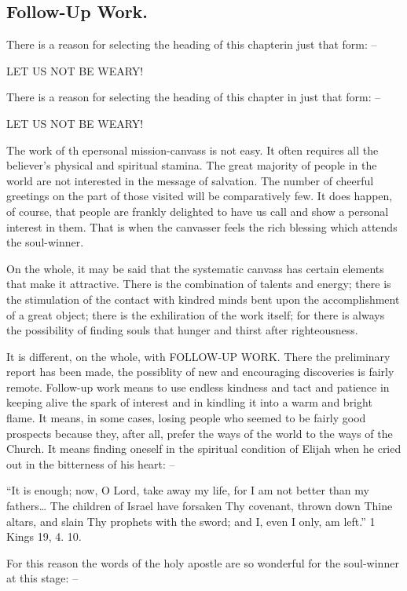\documentclass[
]{book}
\begin{document}
\hypertarget{follow-up-work.}{%
\subsection*{Follow-Up Work.}\label{follow-up-work.}}

There is a reason for selecting the heading of this chapterin just that form: --

LET US NOT BE WEARY!

There is a reason for selecting the heading of this chapter in just that form: --

LET US NOT BE WEARY!

The work of th epersonal mission-canvass is not easy. It often requires all the believer's physical and spiritual stamina. The great majority of people in the world are not interested in the message of salvation. The number of cheerful greetings on the part of those visited will be comparatively few. It does happen, of course, that people are frankly delighted to have us call and show a personal interest in them. That is when the canvasser feels the rich blessing which attends the soul-winner.

On the whole, it may be said that the systematic canvass has certain elements that make it attractive. There is the combination of talents and energy; there is the stimulation of the contact with kindred minds bent upon the accomplishment of a great object; there is the exhiliration of the work itself; for there is always the possibility of finding souls that hunger and thirst after righteousness.

It is different, on the whole, with FOLLOW-UP WORK. There the preliminary report has been made, the possiblity of new and encouraging discoveries is fairly remote. Follow-up work means to use endless kindness and tact and patience in keeping alive the spark of interest and in kindling it into a warm and bright flame. It means, in some cases, losing people who seemed to be fairly good prospects because they, after all, prefer the ways of the world to the ways of the Church. It means finding oneself in the spiritual condition of Elijah when he cried out in the bitterness of his heart: --

``It is enough; now, O Lord, take away my life, for I am not better than my fathers\ldots{} The children of Israel have forsaken Thy covenant, thrown down Thine altars, and slain Thy prophets with the sword; and I, even I only, am left.'' 1 Kings 19, 4. 10.

For this reason the words of the holy apostle are so wonderful for the soul-winner at this stage: --
\end{document}
